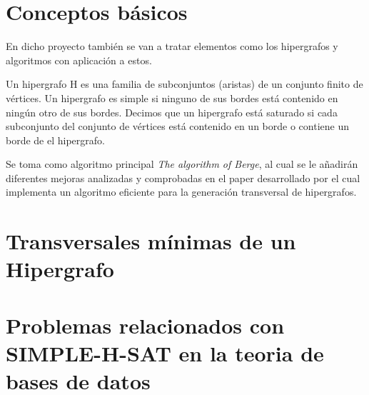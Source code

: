 \documentclass{cosas/tfg_domingo}
\begin{document}
\section{Conceptos básicos}
En dicho proyecto también se van a tratar elementos como los hipergrafos
y algoritmos con aplicación a estos.

Un hipergrafo H es una familia de subconjuntos (aristas) de un conjunto finito de vértices. Un hipergrafo es simple si ninguno de sus bordes está contenido en ningún otro de sus bordes. Decimos que un hipergrafo está saturado si cada subconjunto del conjunto de vértices está contenido en un borde o contiene un borde de el hipergrafo. \citep{Thomas}

Se toma como algoritmo principal \textit{The algorithm of Berge}, al cual se le añadirán diferentes mejoras analizadas y comprobadas en el paper desarrollado por \citep{JGAA-107} el cual implementa un algoritmo eficiente para la generación transversal de hipergrafos.


%

\begin{center}








\end{center}

\section{Transversales mínimas de un Hipergrafo}

\newpage
\section{Problemas relacionados con SIMPLE-H-SAT en la teoria de bases de datos}
\end{document}

